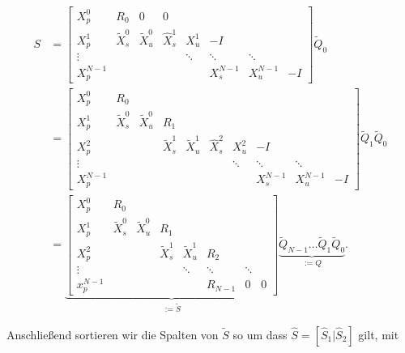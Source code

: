 \begin{align*}
S&=\left[\begin{array}{cccccccc}
X_p^0 & R_0 & 0 & 0 &  &  &  &  \\ 
X_p^1 & \tilde{X}_s^0 & \tilde{X}_u^0 & \hat{X}_s^1 & X_u ^1  & -I &  &  \\ 
\vdots &  &  &  & \ddots & \ddots & \ddots &  \\ 
X_p^{N-1} &  &  &  &  & X_s^{N-1} & X_u^{N-1} & -I
\end{array}  \right]\tilde{Q}_0 \\
&=\left[\begin{array}{cccccccccc}
X_p^0 & R_0 &  &  &  &  &  &  \\ 
X_p^1 & \tilde{X}_s^0 & \tilde{X}_u^0 & R_1 &  &  &  &  \\ 
X_p^2  & &  & \tilde{X}_s^1 & \tilde{X}_u^1 & \hat{X}_s^2 & X_u^2& -I  \\ 
\vdots &  &  & & & & \ddots & \ddots & \ddots &  \\ 
X_p^{N-1} &  &  & & & &  & X_s^{N-1} & X_u^{N-1} & -I
\end{array} \right]\tilde{Q}_1\tilde{Q}_0\\
&=\underbrace{\left[
\begin{array}{cccccccc}
X_p^0 & R_0 &  &  &  &  &  &  \\ 
X_p^1 & \tilde{X}_s^0 & \tilde{X}_u^0 & R_1 &  &  &  &  \\ 
X_p^2 &  &  & \tilde{X}_s^1 & \tilde{X}_u^1 & R_2 &  &  \\ 
\vdots &  &  &  & \ddots & \ddots & \ddots &  \\ 
x_p^{N-1} &  &  &  &  & R_{N-1} & 0 & 0
\end{array}  \right]}_{:=\tilde{S}}
\underbrace{\tilde{Q}_{N-1}\hdots \tilde{Q}_1\tilde{Q}_0}_{:=Q}.
\end{align*}


Anschließend sortieren wir die Spalten von $\tilde{S}$ so um dass $\hat{S}=\left[\hat{S}_1 \vert \hat{S}_2 \right]$ gilt, mit

